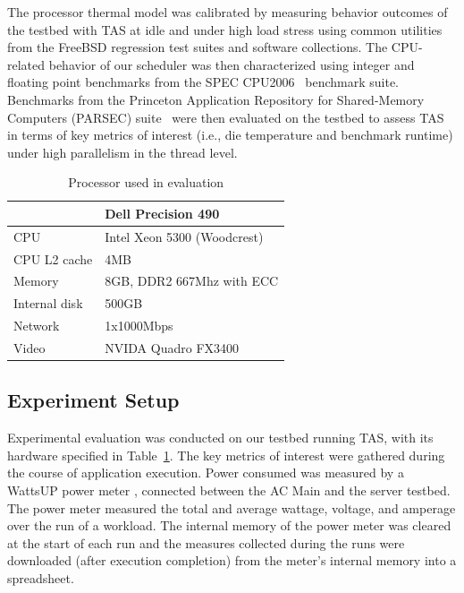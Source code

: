 \documentclass[times, 10pt,twocolumn]{IEEEtran}
\begin{document}
The processor thermal model was calibrated by measuring behavior
outcomes of the testbed with TAS at idle and under high load stress
using common utilities from the FreeBSD regression test suites and
software collections.  The CPU-related behavior of our scheduler was
then characterized using integer and floating point benchmarks from the
SPEC CPU2006~\cite{Henning2006} benchmark suite.  Benchmarks from the
Princeton Application Repository for Shared-Memory Computers (PARSEC)
suite~\cite{Bienia2008} were then evaluated on the testbed to assess TAS
in terms of key metrics of interest (i.e., die temperature and benchmark
runtime) under high parallelism in the thread level.

\begin{table}[tbhp] 
\centering
  \caption{Processor used in evaluation}
  \label{tab:hardware}
  \begin{tabular}{l l} 
\hline 
\hline
&\textbf{Dell Precision 490}\\ 
\hline 
CPU&Intel Xeon 5300 (Woodcrest)\\ 
CPU L2 cache&4MB\\ 
Memory&8GB, DDR2 667Mhz with ECC\\
Internal disk&500GB\\ 
Network&1x1000Mbps\\ 
Video&NVIDA Quadro FX3400\\ 
\hline
  \end{tabular}
\end{table}
\subsection{Experiment Setup}
\label{sec:experiment-setup} 
Experimental evaluation was conducted on our testbed running TAS, with
its hardware specified in Table~\ref{tab:hardware}.  The key metrics of
interest were gathered during the course of application execution.
Power consumed was measured by a WattsUP power meter
\cite{WattsUp2006a}, connected between the AC Main and the server
testbed.  The power meter measured the total and average wattage,
voltage, and amperage over the run of a workload.  The internal memory
of the power meter was cleared at the start of each run and the measures
collected during the runs were downloaded (after execution completion)
from the meter's internal memory into a spreadsheet.
\end{document}
